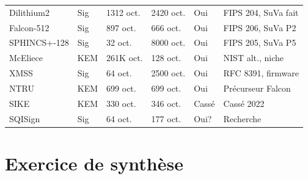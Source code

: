 \documentclass[12pt, a4paper]{article}
\begin{document}
\begin{center}
\begin{longtable}{p{2.8cm}p{1.5cm}p{1.8cm}p{1.8cm}p{1.5cm}p{3.5cm}}
  Dilithium2 & Sig & 1312 oct. & 2420 oct. & \textcolor{sol_green}{Oui} & FIPS 204, SuVa fait \\
  \rowcolor{purple_pq!8}
  Falcon-512 & Sig & 897 oct. & 666 oct. & \textcolor{sol_green}{Oui} & FIPS 206, SuVa P2 \\
  \rowcolor{purple_pq!8}
  SPHINCS+-128 & Sig & 32 oct. & 8000 oct. & \textcolor{sol_green}{Oui} & FIPS 205, SuVa P5 \\
  \rowcolor{purple_pq!8}
  McEliece & KEM & 261K oct. & 128 oct. & \textcolor{sol_green}{Oui} & NIST alt., niche \\
  \rowcolor{purple_pq!8}
  XMSS & Sig & 64 oct. & 2500 oct. & \textcolor{sol_green}{Oui} & RFC 8391, firmware \\
  \rowcolor{purple_pq!8}
  NTRU & KEM & 699 oct. & 699 oct. & \textcolor{sol_green}{Oui} & Précurseur Falcon \\
  \rowcolor{danger_red!8}
  SIKE & KEM & 330 oct. & 346 oct. & \textcolor{danger_red}{Cassé} & Cassé 2022 \\
  \rowcolor{purple_pq!8}
  SQISign & Sig & 64 oct. & 177 oct. & \textcolor{sol_green}{Oui?} & Recherche \\
  \bottomrule
\end{longtable}
\end{center}

\section{Exercice de synthèse}
\end{document}

